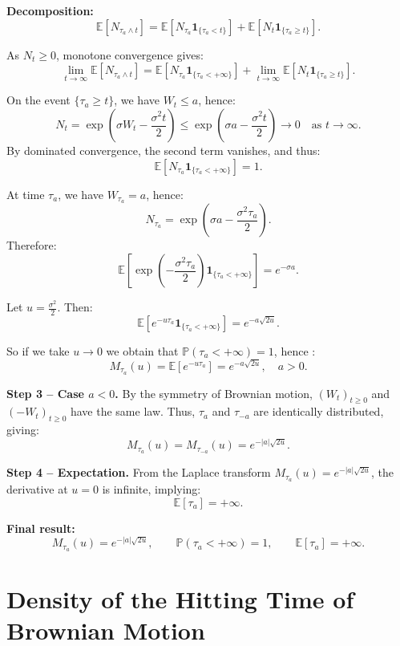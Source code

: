 \medskip
\textbf{Decomposition:}
\[
\mathbb{E}[N_{\tau_a \wedge t}]
= \mathbb{E}\!\left[N_{\tau_a}\mathbf{1}_{\{\tau_a < t\}}\right]
+ \mathbb{E}\!\left[N_t \mathbf{1}_{\{\tau_a \ge t\}}\right].
\]

As \( N_t \ge 0 \), monotone convergence gives:
\[
\lim_{t \to \infty} \mathbb{E}\!\left[N_{\tau_a \wedge t}\right]
= \mathbb{E}\!\left[N_{\tau_a} \mathbf{1}_{\{\tau_a < +\infty\}}\right]
+ \lim_{t \to \infty} \mathbb{E}\!\left[N_t \mathbf{1}_{\{\tau_a \ge t\}}\right].
\]

On the event \( \{\tau_a \ge t\} \), we have \( W_t \le a \), hence:
\[
N_t = \exp\!\left(\sigma W_t - \frac{\sigma^2 t}{2}\right)
\le \exp\!\left(\sigma a - \frac{\sigma^2 t}{2}\right)
\longrightarrow 0 \quad \text{as } t \to \infty.
\]
By dominated convergence, the second term vanishes, and thus:
\[
\mathbb{E}\!\left[N_{\tau_a} \mathbf{1}_{\{\tau_a < +\infty\}}\right] = 1.
\]

\medskip
At time \( \tau_a \), we have \( W_{\tau_a} = a \), hence:
\[
N_{\tau_a} = \exp\!\left(\sigma a - \frac{\sigma^2 \tau_a}{2}\right).
\]
Therefore:
\[
\mathbb{E}\!\left[\exp\!\left(-\frac{\sigma^2 \tau_a}{2}\right)
\mathbf{1}_{\{\tau_a < +\infty\}}\right]
= e^{-\sigma a}.
\]

Let \( u = \frac{\sigma^2}{2} \). Then:
\[
\boxed{\mathbb{E}\!\left[e^{-u \tau_a}\mathbf{1}_{\{\tau_a < +\infty\}}\right]
= e^{-a \sqrt{2u}}.}
\]

So if we take $u \rightarrow 0$ we obtain that \( \mathbb{P}(\tau_a < +\infty) = 1 \), hence :  
\[
\boxed{M_{\tau_a}(u) = \mathbb{E}[e^{-u\tau_a}] = e^{-a \sqrt{2u}}, \quad a>0.}
\]

\medskip
\textbf{Step 3 – Case \( a < 0 \).}  
By the symmetry of Brownian motion, \( (W_t)_{t \ge 0} \) and \( (-W_t)_{t \ge 0} \) have the same law.
Thus, \( \tau_a \) and \( \tau_{-a} \) are identically distributed, giving:
\[
M_{\tau_a}(u) = M_{\tau_{-a}}(u) = e^{-|a|\sqrt{2u}}.
\]

\medskip
\textbf{Step 4 – Expectation.}  
From the Laplace transform \( M_{\tau_a}(u) = e^{-|a|\sqrt{2u}} \),
the derivative at \( u=0 \) is infinite, implying:
\[
\boxed{\mathbb{E}[\tau_a] = +\infty.}
\]

\medskip
\textbf{Final result:}
\[
\boxed{
M_{\tau_a}(u) = e^{-|a|\sqrt{2u}}, \qquad
\mathbb{P}(\tau_a < +\infty)=1, \qquad
\mathbb{E}[\tau_a] = +\infty.
}
\]

\section{Density of the Hitting Time of Brownian Motion}

